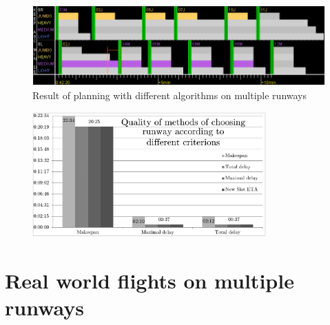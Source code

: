 \begin{figure}[h]
    \centering
    \includegraphics[width=\textwidth]{figures/2rwy-weight.png}
    \caption{Result of planning with different algorithms on multiple runways}
    \label{fig:2rwy-weight}
\end{figure}

\begin{figure}[h]
    \centering
    \includegraphics[width=0.8\textwidth]{graphs/2rwy-weights.pdf}
    \caption{}
    \label{graph:2rwy-weights}
\end{figure}

\section{Real world flights on multiple runways}

